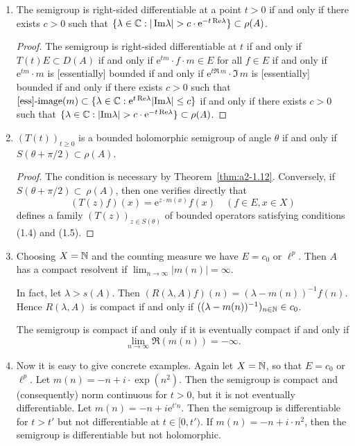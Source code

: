 \begin{example}
\begin{enumerate}[\upshape (i), wide, labelindent=.5em]
\item \label{ex:a2-1.28-2}
The semigroup is right-sided differentiable at a point
$t > 0$ 
if and only if there exists $c > 0$ such that 
$\{\lambda \in \mathbb{C} : |\mathop{}\!\mathrm{Im} \lambda| > c \cdot \mathrm{e}^{-t\mathop{}\!\mathrm{Re}\lambda}\} \subset \rho(A)$.

\begin{proof}
The semigroup is right-sided differentiable at $t$ 
if and only if $T(t)E \subset D(A)$ 
if and only if $\mathrm{e}^{tm} \cdot f \cdot m \in E$ for all $f \in E$ 
if and only if $\mathrm{e}^{tm} \cdot m$ is [essentially] bounded 
if and only if $\mathrm{e}^{t\Re\, m} \cdot \Im\, m$ is [essentially] bounded 
if and only if there exists $c > 0$ such that 
$[\text{ess}]\text{-}\text{image}(m) \subset 
\{\lambda \in \mathbb{C} : \mathrm{e}^{t\mathop{}\!\mathrm{Re}\lambda}|\text{Im}\lambda| \leq c\}$ 
if and only if there exists $c > 0$ such that 
$\{\lambda \in \mathbb{C} : |\text{Im}\lambda| > c \cdot \mathrm{e}^{-t\mathop{}\!\mathrm{Re}\lambda}\} \subset \rho(A)$.
\end{proof}

\item \label{ex:a2-1.28-3}
$(T(t))_{t \geq 0}$ is a bounded holomorphic semigroup of angle $\theta$ if and only if \\
$S(\theta + \pi/2) \subset \rho(A)$.

\begin{proof}
The condition is necessary by Theorem~\ref{thm:a2-1.12}.
Conversely, if $S(\theta + \pi/2) \subset~\rho(A)$, 
then one verifies directly that 
\[
(T(z)f)(x) = \mathrm{e}^{z \cdot m(x)}f(x) \quad (f \in E, x \in X) 
\]
defines a family $(T(z))_{z \in S(\theta)}$ of bounded operators satisfying conditions (1.4) and (1.5).
\end{proof}

\item \label{ex:a2-1.28-4}
Choosing $X = \mathbb{N}$ and the counting measure we have $E = c_{0}$ or $\ell^{p}$.
Then $A$ has a compact resolvent if 
$\lim_{n \to \infty} |m(n)| = \infty$.  

In fact, let $\lambda > s(A)$.
Then $(R(\lambda,A)f)(n) = (\lambda-m(n))^{-1}f(n)$.
Hence $R(\lambda,A)$ is compact if and only if $((\lambda-m(n))^{-1})_{n \in \mathbb{N}} \in c_{0}$. 

The semigroup is compact if and only if it is eventually compact if and only if 
\[
\lim_{n \to \infty} \Re(m(n)) = -\infty.
\]

\item \label{ex:a2-1.28-5}
Now it is easy to give concrete examples.
Again let $X = \mathbb{N}$, so that $E = c_{0}$ or $\ell^{p}$.
Let $m(n) = -n + i \cdot \exp(n^2)$.
Then the semigroup is compact and (consequently) norm continuous for $t > 0$, but it is not eventually differentiable.
Let $m(n) = -n + i\mathrm{e}^{t'n}$.
Then the semigroup is differentiable for $t > t'$ but not differentiable at $t \in [0,t')$.
If $m(n) = -n + i \cdot n^2$, then the semigroup is differentiable but not holomorphic.
\end{enumerate}
\end{example}	

